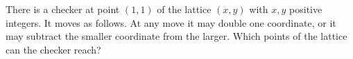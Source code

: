 There is a checker at point $(1, 1)$ of the lattice $(x, y)$ with $x, y$ positive integers. It moves as follows. At any move it may double one coordinate, or it may subtract the smaller coordinate from the larger. Which points of the lattice can the checker reach?
